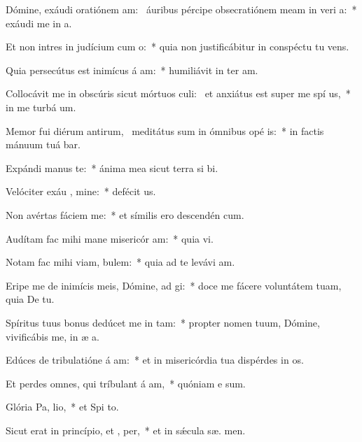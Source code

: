 \item Dómine, exáudi oratiónem am:~\pscross{} áuribus pércipe obsecratiónem meam in veri a:~* exáudi me in  a.
\item Et non intres in judícium cum  o:~* quia non justificábitur in conspéctu tu  vens.
\item Quia persecútus est inimícus á am:~* humiliávit in ter  am.
\item Collocávit me in obscúris sicut mórtuos culi:~\pscross{} et anxiátus est super me spí us,~* in me turbá   um.
\item Memor fui diérum antirum,~\pscross{} meditátus sum in ómnibus opé is:~* in factis mánuum tuá bar.
\item Expándi manus   te:~* ánima mea sicut terra si  bi.
\item Velóciter exáu , mine:~* defécit  us.
\item Non avértas fáciem   me:~* et símilis ero descendén  cum.
\item Audítam fac mihi mane misericór am:~* quia   vi.
\item Notam fac mihi viam,   bulem:~* quia ad te levávi  am.
\item Eripe me de inimícis meis, Dómine, ad  gi:~* doce me fácere voluntátem tuam, quia De   tu.
\item Spíritus tuus bonus dedúcet me in  tam:~* propter nomen tuum, Dómine, vivificábis me, in æ a.
\item Edúces de tribulatióne á am:~* et in misericórdia tua dispérdes in os.
\item Et perdes omnes, qui tríbulant á am,~* quóniam e   sum.
\item Glória Pa,  lio,~* et Spi to.
\item Sicut erat in princípio, et ,  per,~* et in sǽcula sæ. men.
